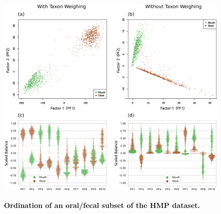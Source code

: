 
\begin{figure}[!htb]
    \centering
     \includegraphics[width=\linewidth]{pdf/hmp_pf_of_600_factor_ordination.pdf}
    \begin{subfigure}{0pt}
        \label{supp:fig:hmp_pf_of_600_factor_ordination:sub:2d_with_taxon_weighting}
    \end{subfigure}
    \begin{subfigure}{0pt}
        \label{supp:fig:hmp_pf_of_600_factor_ordination:sub:2d_without_taxon_weighting}
    \end{subfigure}
    \begin{subfigure}{0pt}
        \label{supp:fig:hmp_pf_of_600_factor_ordination:sub:10d_with_taxon_weighting}
    \end{subfigure}
    \begin{subfigure}{0pt}
        \label{supp:fig:hmp_pf_of_600_factor_ordination:sub:10d_without_taxon_weighting}
    \end{subfigure}
    \caption{
        \textbf{Ordination of an oral/fecal subset of the \ac{HMP} dataset.}
}
\end{figure}
